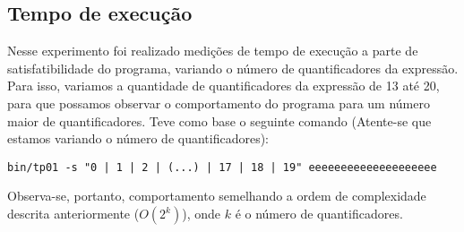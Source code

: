 \documentclass{article}
\begin{document}


\subsection{Tempo de execução}

Nesse experimento foi realizado medições de tempo de execução a parte de satisfatibilidade do programa, variando o número de quantificadores da expressão. Para isso,
variamos a quantidade de quantificadores da expressão de 13 até 20, para que possamos observar o comportamento do programa para um número maior de quantificadores.
Teve como base o seguinte comando (Atente-se que estamos variando o número de quantificadores): 


\verb#bin/tp01 -s "0 | 1 | 2 | (...) | 17 | 18 | 19" eeeeeeeeeeeeeeeeeeee#



Observa-se, portanto, comportamento semelhando a ordem de complexidade descrita anteriormente ($O(2^k)$), onde $k$ é o número de quantificadores.
\end{document}
